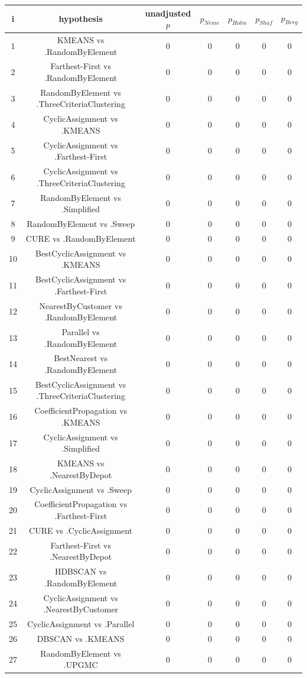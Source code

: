 \documentclass[a4paper,10pt]{article}
\begin{document}
\begin{landscape}
\begin{table}[!htp]
\centering\scriptsize
\begin{tabular}{ccccccc}
i&hypothesis&unadjusted $p$&$p_{Neme}$&$p_{Holm}$&$p_{Shaf}$&$p_{Berg}$\\
\hline1&KMEANS vs .RandomByElement&0&0&0&0&0\\
2&Farthest-First vs .RandomByElement&0&0&0&0&0\\
3&RandomByElement vs .ThreeCriteriaClustering&0&0&0&0&0\\
4&CyclicAssignment vs .KMEANS&0&0&0&0&0\\
5&CyclicAssignment vs .Farthest-First&0&0&0&0&0\\
6&CyclicAssignment vs .ThreeCriteriaClustering&0&0&0&0&0\\
7&RandomByElement vs .Simplified&0&0&0&0&0\\
8&RandomByElement vs .Sweep&0&0&0&0&0\\
9&CURE vs .RandomByElement&0&0&0&0&0\\
10&BestCyclicAssignment vs .KMEANS&0&0&0&0&0\\
11&BestCyclicAssignment vs .Farthest-First&0&0&0&0&0\\
12&NearestByCustomer vs .RandomByElement&0&0&0&0&0\\
13&Parallel vs .RandomByElement&0&0&0&0&0\\
14&BestNearest vs .RandomByElement&0&0&0&0&0\\
15&BestCyclicAssignment vs .ThreeCriteriaClustering&0&0&0&0&0\\
16&CoefficientPropagation vs .KMEANS&0&0&0&0&0\\
17&CyclicAssignment vs .Simplified&0&0&0&0&0\\
18&KMEANS vs .NearestByDepot&0&0&0&0&0\\
19&CyclicAssignment vs .Sweep&0&0&0&0&0\\
20&CoefficientPropagation vs .Farthest-First&0&0&0&0&0\\
21&CURE vs .CyclicAssignment&0&0&0&0&0\\
22&Farthest-First vs .NearestByDepot&0&0&0&0&0\\
23&HDBSCAN vs .RandomByElement&0&0&0&0&0\\
24&CyclicAssignment vs .NearestByCustomer&0&0&0&0&0\\
25&CyclicAssignment vs .Parallel&0&0&0&0&0\\
26&DBSCAN vs .KMEANS&0&0&0&0&0\\
27&RandomByElement vs .UPGMC&0&0&0&0&0\\

\end{tabular}
\end{table}
\end{landscape}
\end{document}
